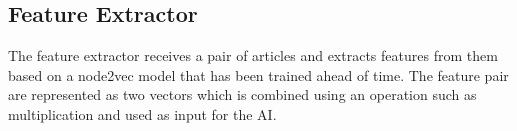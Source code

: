 \subsection{Feature Extractor}
The feature extractor receives a pair of articles and extracts features from them based on a node2vec model that has been trained ahead of time. The feature pair are represented as two vectors which is combined using an operation such as multiplication  and used as input for the AI.

